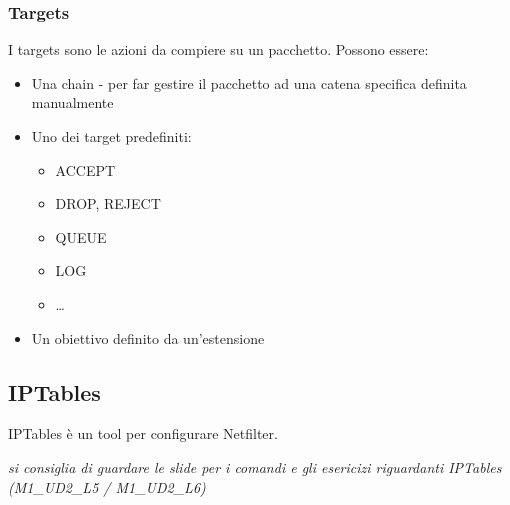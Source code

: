 \subsubsection{Targets}
I targets sono le azioni da compiere su un pacchetto. Possono essere:
\begin{itemize}
    \item Una chain - per far gestire il pacchetto ad una catena specifica definita manualmente
    \item Uno dei target predefiniti:
    \begin{itemize}
        \item ACCEPT 
        \item DROP, REJECT 
        \item QUEUE 
        \item LOG 
        \item \dots
    \end{itemize}
    \item Un obiettivo definito da un'estensione
\end{itemize}


\subsection{IPTables}
IPTables è un tool per configurare Netfilter.

\medskip

\noindent \textit{si consiglia di guardare le slide per i 
comandi e gli esericizi riguardanti IPTables (M1\_UD2\_L5 / M1\_UD2\_L6)}




